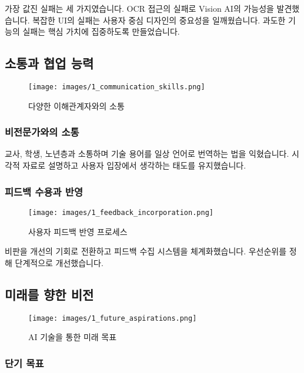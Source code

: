 가장 값진 실패는 세 가지였습니다. OCR 접근의 실패로 Vision AI의 가능성을 발견했습니다. 복잡한 UI의 실패는 사용자 중심 디자인의 중요성을 일깨웠습니다. 과도한 기능의 실패는 핵심 가치에 집중하도록 만들었습니다.

\subsection{소통과 협업 능력}

\begin{figure}[H]
    \centering
    \texttt{[image: images/1\_communication\_skills.png]}
    \caption{다양한 이해관계자와의 소통}
    \label{fig:communication_skills}
\end{figure}

\subsubsection{비전문가와의 소통}

교사, 학생, 노년층과 소통하며 기술 용어를 일상 언어로 번역하는 법을 익혔습니다. 시각적 자료로 설명하고 사용자 입장에서 생각하는 태도를 유지했습니다.

\subsubsection{피드백 수용과 반영}

\begin{figure}[H]
    \centering
    \texttt{[image: images/1\_feedback\_incorporation.png]}
    \caption{사용자 피드백 반영 프로세스}
    \label{fig:feedback_incorporation}
\end{figure}

비판을 개선의 기회로 전환하고 피드백 수집 시스템을 체계화했습니다. 우선순위를 정해 단계적으로 개선했습니다.

\subsection{미래를 향한 비전}

\begin{figure}[H]
    \centering
    \texttt{[image: images/1\_future\_aspirations.png]}
    \caption{AI 기술을 통한 미래 목표}
    \label{fig:future_aspirations}
\end{figure}

\subsubsection{단기 목표}

